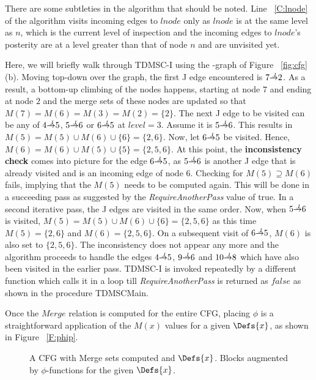 {There are some subtleties in the algorithm that should be noted. Line ~\ref{C:lnode} of the algorithm visits incoming edges to $lnode$ only as $lnode$ is at the same level as $n$, which is the current level of inspection and the incoming edges to $lnode$'s posterity are at a level greater than that of node $n$ and are unvisited yet. 

Here, we will briefly walk through TDMSC-I using the \DJ-graph of Figure ~\ref{fig:cfg}(b). Moving top-down over the graph, the first J edge encountered is $7 \st{J} 2$. As a result, a bottom-up climbing of the nodes happens, starting at node $7$ and
ending at node $2$ and the merge sets of these nodes are updated so that $M(7) = M(6) = M(3) = M(2) = \{2\}$. The next J edge
to be visited can be any of $4 \st{J} 5$, $5 \st{J} 6$ or $6 \st{J} 5$ at $level = 3$. Assume it is $5 \st{J} 6$. This results in $M(5) = M(5) \cup M(6) \cup \{6\} = \{2,6\}$. Now, let $6 \st{J} 5$ be visited. Hence, $M(6) = M(6) \cup M(5) \cup \{5\} = \{2,5,6\}$. At this point, the {\bf inconsistency check} comes into picture for the edge $6 \st{J} 5$, as $5 \st{J} 6$ is another J edge that is already visited and is an incoming edge of node $6$. Checking for $M(5) \supseteq M(6)$ fails, implying that the $M(5)$ needs to be computed again. This will be done in a succeeding pass as suggested by the {\it RequireAnotherPass} value of true. In a second iterative pass, the J edges are visited in the same order. Now, when $5 \st{J} 6$ is visited, 
$M(5) = M(5) \cup M(6) \cup \{6\} = \{2,5,6\}$ as this time 
$M(5) = \{2,6\}$ 
and $M(6) = \{2,5,6\}$. On a subsequent visit of $6 \st{J} 5$, $M(6)$ is also set to $\{2,5,6\}$. The inconsistency does not appear any more and the algorithm proceeds to handle the edges $4 \st{J} 5$, $9 \st{J} 6$ and $10 \st{J} 8$ which have
also been visited in the earlier pass. TDMSC-I is invoked repeatedly by a different function
which calls it in a loop till {\it RequireAnotherPass} is returned as $false$ as shown in the procedure TDMSCMain.

Once the $Merge$ relation is computed for the entire CFG, placing $\phi$ is a straightforward application of the $M(x)$ values for a given $\Defs{x}$, as shown in Figure ~\ref{F:phip}.
\begin{figure}[!ht]
\centering
\begin{minipage}[t]{5in}
 A CFG with Merge sets computed and $\Defs{x}$.
 Blocks augmented by $\phi$-functions for the given $\Defs{x}$.


\end{minipage}
\end{figure}}
